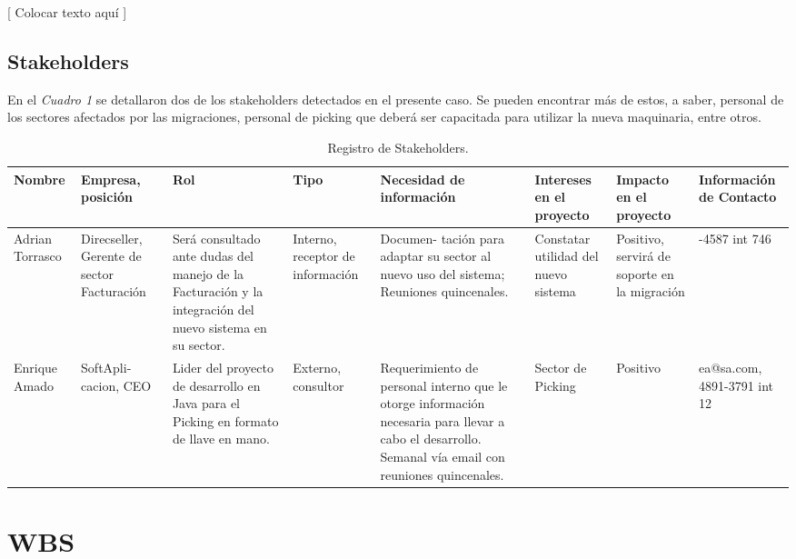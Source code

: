 \documentclass{article}
\begin{document}
	[ Colocar texto aquí ]

\medskip


\subsection{Stakeholders}

	En el \textit{Cuadro 1} se detallaron dos de los stakeholders detectados en el presente caso. Se pueden encontrar más de estos, a saber, personal de los sectores afectados por las migraciones, personal de picking que deberá ser capacitada para utilizar la nueva maquinaria, entre otros.
	\medskip

	\begin{table}[!hbt]
		\begin{center}
		\begin{tabular}{| >{\raggedright}m{1.8cm} | >{\centering}m{1.5cm} | >{\raggedright}m{2cm} | >{\raggedright}m{1.5cm} | >{\centering}m{2.2cm} | >{\centering}m{1.8cm} | >{\centering}m{1.8cm} | >{\centering}m{2cm} |}
			\hline
			\rowcolor[gray]{0.9}\textbf{Nombre} & \textbf{Empresa, posición} & \textbf{Rol} & \textbf{Tipo} & \textbf{Necesidad de información} & \textbf{Intereses en el proyecto} & \textbf{Impacto en el proyecto} & \textbf{Información de Contacto} \tabularnewline
			\hline
			Adrian Torrasco & Direcseller, Gerente de sector Facturación & Será consultado ante dudas del manejo de la Facturación y la integración del nuevo sistema en su sector. & Interno, receptor de información & Documen- tación para adaptar su sector al nuevo uso del sistema; Reuniones quincenales. & Constatar utilidad del nuevo sistema & Positivo, servirá de soporte en la migración & 4012-4587 int 746 \tabularnewline
			\hline
			Enrique Amado & SoftApli- cacion, CEO & Lider del proyecto de desarrollo en Java para el Picking en formato de llave en mano. & Externo, consultor & Requerimiento de personal interno que le otorge información necesaria para llevar a cabo el desarrollo. Semanal vía email con reuniones quincenales. & Sector de Picking & Positivo & ea@sa.com, 4891-3791 int 12 \tabularnewline
			\hline
		\end{tabular}
		\caption{Registro de Stakeholders.}
		\end{center}
	\end{table}


\bigskip


\newpage


%
%
\section{WBS}
\end{document}

